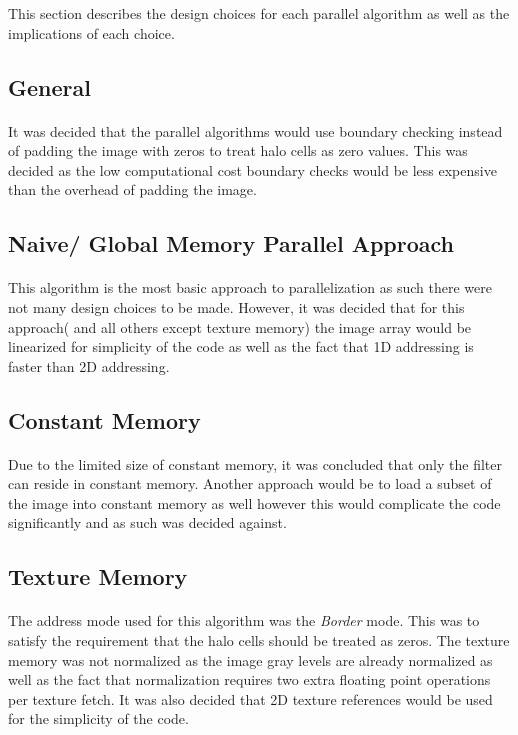 \documentclass[10pt]{article}
\begin{document}
	This section describes the design choices for each parallel algorithm as well as the implications of each choice.
	\subsection{General}
	
	\paragraph{} It was decided that the parallel algorithms would use boundary checking instead of padding the image with zeros to treat halo cells as zero values. This was decided as the low computational cost boundary checks would be less expensive than the overhead of padding the image. 
	\subsection{Naive/ Global Memory Parallel Approach}
	
	\paragraph{} This algorithm is the most basic approach to parallelization as such there were not many design choices to be made. However, it was decided that for this approach( and all others except texture memory) the image array would be linearized for simplicity of the code as well as the fact that 1D addressing is faster than 2D addressing. 
	
	\subsection{Constant Memory} 
	
	\paragraph{} Due to the limited size of constant memory, it was concluded that only the filter can reside in constant memory. Another approach would be to load a subset of the image into constant memory as well however this would complicate the code significantly and as such was decided against.
	
	\subsection{Texture Memory}
	
	\paragraph{} The address mode used for this algorithm was the \emph{Border} mode. This was to satisfy the requirement that the halo cells should be treated as zeros. The texture memory was not normalized as the image gray levels are already normalized as well as the fact that normalization requires two extra floating point operations per texture fetch. It was also decided that 2D texture references would be used for the simplicity of the code. 
	
\end{document}
